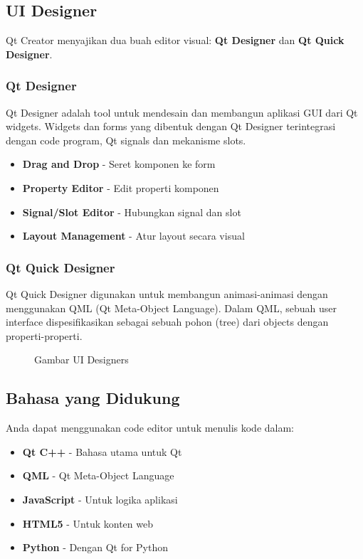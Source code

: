 \subsection{UI Designer}

Qt Creator menyajikan dua buah editor visual: \textbf{Qt Designer} dan \textbf{Qt Quick Designer}.

\subsubsection{Qt Designer}

Qt Designer adalah tool untuk mendesain dan membangun aplikasi GUI dari Qt widgets. Widgets dan forms yang dibentuk dengan Qt Designer terintegrasi dengan code program, Qt signals dan mekanisme slots.

\begin{itemize}
\item \textbf{Drag and Drop} - Seret komponen ke form
\item \textbf{Property Editor} - Edit properti komponen
\item \textbf{Signal/Slot Editor} - Hubungkan signal dan slot
\item \textbf{Layout Management} - Atur layout secara visual
\end{itemize}

\subsubsection{Qt Quick Designer}

Qt Quick Designer digunakan untuk membangun animasi-animasi dengan menggunakan QML (Qt Meta-Object Language). Dalam QML, sebuah user interface dispesifikasikan sebagai sebuah pohon (tree) dari objects dengan properti-properti.

\begin{figure}[htbp]
\centering
{}
\caption{Gambar UI Designers}
\label{fig:gambar-ui-designers}
\end{figure}

\subsection{Bahasa yang Didukung}

Anda dapat menggunakan code editor untuk menulis kode dalam:
\begin{itemize}
\item \textbf{Qt C++} - Bahasa utama untuk Qt
\item \textbf{QML} - Qt Meta-Object Language
\item \textbf{JavaScript} - Untuk logika aplikasi
\item \textbf{HTML5} - Untuk konten web
\item \textbf{Python} - Dengan Qt for Python
\end{itemize}

